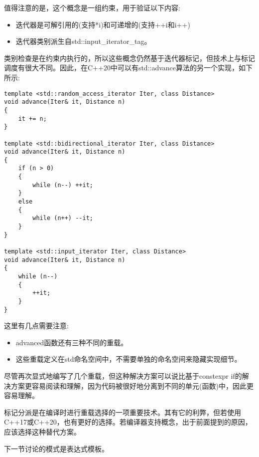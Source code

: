 值得注意的是，这个概念是一组约束，用于验证以下内容:

\begin{itemize}
\item
迭代器是可解引用的(支持*i)和可递增的(支持++i和i++)

\item
迭代器类别派生自std::input\_iterator\_tag。
\end{itemize}

类别检查是在约束内执行的，所以这些概念仍然基于迭代器标记，但技术上与标记调度有很大不同。因此，在C++20中可以有std::advance算法的另一个实现，如下所示:

\begin{lstlisting}[style=styleCXX]
template <std::random_access_iterator Iter, class Distance>
void advance(Iter& it, Distance n)
{
	it += n;
}

template <std::bidirectional_iterator Iter, class Distance>
void advance(Iter& it, Distance n)
{
	if (n > 0)
	{
		while (n--) ++it;
	}
	else
	{
		while (n++) --it;
	}
}

template <std::input_iterator Iter, class Distance>
void advance(Iter& it, Distance n)
{
	while (n--)
	{
		++it;
	}
}
\end{lstlisting}

这里有几点需要注意:

\begin{itemize}
\item
advanced函数还有三种不同的重载。

\item
这些重载定义在std命名空间中，不需要单独的命名空间来隐藏实现细节。
\end{itemize}

尽管再次显式地编写了几个重载，但这种解决方案可以说比基于constexpr if的解决方案更容易阅读和理解，因为代码被很好地分离到不同的单元(函数)中，因此更容易理解。

标记分派是在编译时进行重载选择的一项重要技术。其有它的利弊，但若使用C++17或C++20，也有更好的选择。若编译器支持概念，出于前面提到的原因，应该选择这种替代方案。

下一节讨论的模式是表达式模板。


